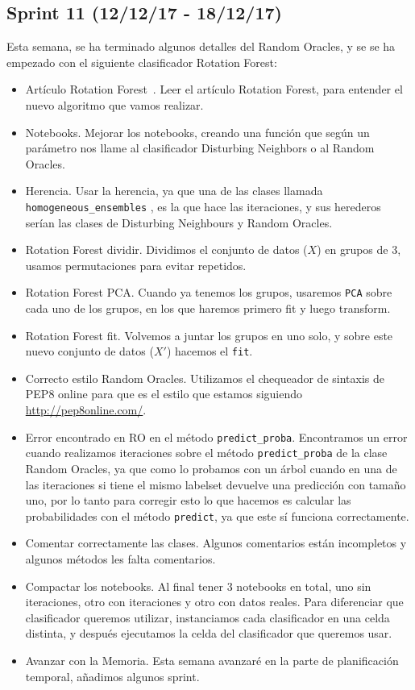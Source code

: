 \subsection{Sprint 11 (12/12/17 - 18/12/17)}
Esta semana, se ha terminado algunos detalles del Random Oracles, y se se ha empezado con el siguiente clasificador Rotation Forest:
\begin{itemize}
\item Artículo Rotation Forest~\cite{rotationforest}. Leer el artículo Rotation Forest, para entender el nuevo algoritmo que vamos realizar.
\item Notebooks. Mejorar los notebooks, creando una función que según un parámetro nos llame al clasificador Disturbing Neighbors o al Random Oracles.
\item Herencia. Usar la herencia, ya que una de las clases llamada \texttt{homogeneous\_ensembles} , es la que hace las iteraciones, y sus herederos serían las clases de Disturbing Neighbours y Random Oracles.
\item Rotation Forest dividir. Dividimos el conjunto de datos ($X$) en grupos de 3, usamos permutaciones para evitar repetidos.
\item Rotation Forest PCA. Cuando ya tenemos los grupos, usaremos \texttt{PCA} sobre cada uno de los grupos, en los que haremos primero fit y luego transform.
\item Rotation Forest fit. Volvemos a juntar los grupos en uno solo, y sobre este nuevo conjunto de datos ($X'$) hacemos el \texttt{fit}.
\item Correcto estilo Random Oracles. Utilizamos el chequeador de sintaxis de PEP8 online para que es el estilo que estamos siguiendo \url{http://pep8online.com/}.
\item Error encontrado en RO en el método \texttt{predict\_proba}. Encontramos un error cuando realizamos iteraciones sobre el método \texttt{predict\_proba} de la clase Random Oracles, ya que como lo probamos con un árbol cuando en una de las iteraciones si tiene el mismo labelset devuelve una predicción con tamaño uno, por lo tanto para corregir esto lo que hacemos es calcular las probabilidades con el método \texttt{predict}, ya que este sí funciona correctamente.
\item Comentar correctamente las clases. Algunos comentarios están incompletos y algunos métodos les falta comentarios.
\item Compactar los notebooks. Al final tener 3 notebooks en total, uno sin iteraciones, otro con iteraciones y otro con datos reales. Para diferenciar que clasificador queremos utilizar, instanciamos cada clasificador en una celda distinta, y después ejecutamos la celda del clasificador que queremos usar.
\item Avanzar con la Memoria. Esta semana avanzaré en la parte de planificación temporal, añadimos algunos sprint.
\end{itemize}

